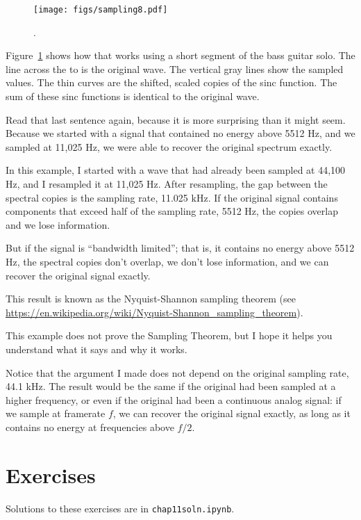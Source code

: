 \documentclass[12pt]{book} \usepackage[width=5.5in,height=8.5in, hmarginratio=3:2,vmarginratio=1:1]{geometry}
\begin{document}
\begin{figure} 

\centerline{\texttt{[image: figs/sampling8.pdf]}} \caption{.} \label{fig.sampling8} \end{figure} 

Figure~\ref{fig.sampling8} shows how that works using a short segment of the bass guitar solo. The line across the to is the original wave. The vertical gray lines show the sampled values. The thin curves are the shifted, scaled copies of the sinc function. The sum of these sinc functions is identical to the original wave. 

Read that last sentence again, because it is more surprising than it might seem. Because we started with a signal that contained no energy above 5512 Hz, and we sampled at 11,025 Hz, we were able to recover the original spectrum exactly. 

In this example, I started with a wave that had already been sampled at 44,100 Hz, and I resampled it at 11,025 Hz. After resampling, the gap between the spectral copies is the sampling rate, 11.025 kHz. If the original signal contains components that exceed half of the sampling rate, 5512 Hz, the copies overlap and we lose information. 

But if the signal is ``bandwidth limited''; that is, it contains no energy above 5512 Hz, the spectral copies don't overlap, we don't lose information, and we can recover the original signal exactly. 

This result is known as the Nyquist-Shannon sampling theorem (see \url{https://en.wikipedia.org/wiki/Nyquist-Shannon_sampling_theorem}). 

This example does not prove the Sampling Theorem, but I hope it helps you understand what it says and why it works. 

Notice that the argument I made does not depend on the original sampling rate, 44.1 kHz. The result would be the same if the original had been sampled at a higher frequency, or even if the original had been a continuous analog signal: if we sample at framerate $f$, we can recover the original signal exactly, as long as it contains no energy at frequencies above $f/2$. 

\section{Exercises} 

Solutions to these exercises are in {\tt chap11soln.ipynb}. 
\end{document}
